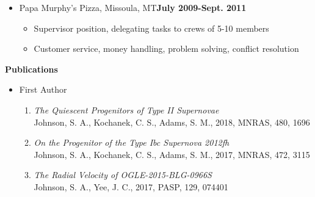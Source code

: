 \documentclass{article}
\begin{document}
\begin{itemize}
\item[]{\large{Papa Murphy's Pizza}}, Missoula, MT\hfill{\bf{July 2009-Sept. 2011}}
\begin{itemize}
\item Supervisor position, delegating tasks to crews of 5-10 members
\item Customer service, money handling, problem solving, conflict resolution

\end{itemize}


\end{itemize}

{\large{\bf Publications}}
\begin{itemize}

\item[]{\large{First Author}}
\begin{enumerate}
\item{\it{The Quiescent Progenitors of Type II Supernovae}}\\ Johnson, S. A., Kochanek, C. S., Adams, S. M., 2018, MNRAS, 480, 1696 
\item{\it{On the Progenitor of the Type Ibc Supernova 2012fh}}\\ Johnson, S. A., Kochanek, C. S., Adams, S. M., 2017, MNRAS, 472, 3115 
\item{\it The Radial Velocity of OGLE-2015-BLG-0966S}\\ Johnson, S. A., Yee, J. C., 2017, PASP, 129, 074401 
\end{enumerate}



\end{itemize}
\end{document}
